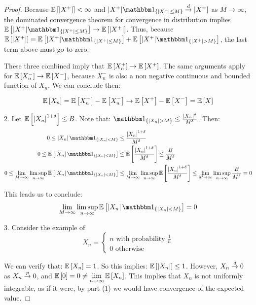 \documentclass[12pt, letterpaper]{paper}
\begin{document}
\begin{question}
\begin{proof}
    Because $\mathbb{E} \left [ \left \lvert X^{+} \right \rvert \right ]<\infty$ and $|X^+|
    \indicate{|X^+| \leq M} \overset{d}{\to} |X^+|$ as
    $M \rightarrow \infty$, the dominated convergence theorem for convergence in distribution
    implies $\exV{|X^+| \indicate{|X^+| \leq M}} \to \exV{|X^+|}$. Thus, because  $\exV{|X^+|} = \exV{|X^+|\indicate{|X^+| \leq M}} + \exV{|X^+|\indicate{|X^+| > M}}$, the last term above must go to zero.

    These three combined imply that $\mathbb{E} \left [ X_n^+ \right ] \rightarrow \mathbb{E} \left [ X^+ \right ]$. The
    same arguments apply for $\mathbb{E} \left [ X_n^- \right ] \rightarrow \mathbb{E} \left [ X^- \right ]$, because
    $X_{n}^{-}$ is also a non negative continuous and bounded function
    of $X_n$. We can conclude then:

    \begin{equation*}
      \mathbb{E} \left [ X_n \right ] = \mathbb{E} \left [ X_n^+ \right ] - \mathbb{E} \left [ X_n^- \right ] \rightarrow \mathbb{E} \left [ X^+ \right ] - \mathbb{E} \left [ X^- \right ] = \mathbb{E} \left [ X \right ] 
    \end{equation*}

    2. Let $\mathbb{E} \left [ \left \lvert X_n \right \rvert^{1+\delta} \right ] \leq B$. Note that: $\indicate{
      \abs{X_n} > M} \leq \frac{\abs{X_n}^{\delta}}{M^{\delta}}$. Then:
    \begin{alignat*}{3}
      0 \leq \abs{X_n}\indicate{\abs{X_n} < M} &\leq
      \frac{\abs{X_n}^{1+\delta}}{M^{\delta}}  \\
      0 \leq \exV{\abs{X_n}\indicate{\abs{X_n} < M}} &\leq
      \exV{\frac{\abs{X_n}^{1+\delta}}{M^{\delta}}} \leq \frac{B}{M^{\delta}}\\
      0 \leq \Lim_{M\rightarrow\infty}\limsup_{n\rightarrow\infty}\exV{\abs{X_n}\indicate{\abs{X_n} < M}} &\leq
      \lim_{M\rightarrow\infty}\limsup_{n\rightarrow\infty}\exV{\frac{\abs{X_n}^{1+\delta}}{M^{\delta}}}
      \leq \lim_{M\rightarrow\infty}\limsup_{n\rightarrow\infty}\frac{B}{M^{\delta}} = 0\\
    \end{alignat*}

    This leads us to conclude:
    \begin{equation*}
      \Lim_{M\rightarrow\infty}\limsup_{n\rightarrow\infty}\exV{\abs{X_n}\indicate{\abs{X_n} < M}} = 0
    \end{equation*}


    3. Consider the example of
    \begin{equation*}
      X_n =
      \begin{cases}
        n \text{ with probability }\frac{1}{n}\\
        0 \text{ otherwise}
      \end{cases}
    \end{equation*}

    We can verify that: $\mathbb{E} \left [ X_n \right ]  = 1$. So this implies:
    $\mathbb{E} \left [ \left \lvert X_n \right \rvert \right ] \leq 1$. However, $X_n \overset{d}{\to} 0$ as $X_n \overset{p}{\to}
    0$, and $\mathbb{E} \left [ 0 \right ] = 0 \neq \lim\limits_{n \rightarrow \infty}\mathbb{E} \left [ X_n \right ]$. This implies that
    $X_n$ is not uniformly integrable, as if it were, by part (1) we
    would have convergence of the expected value.
  \end{proof}

\end{question}
\end{document}
